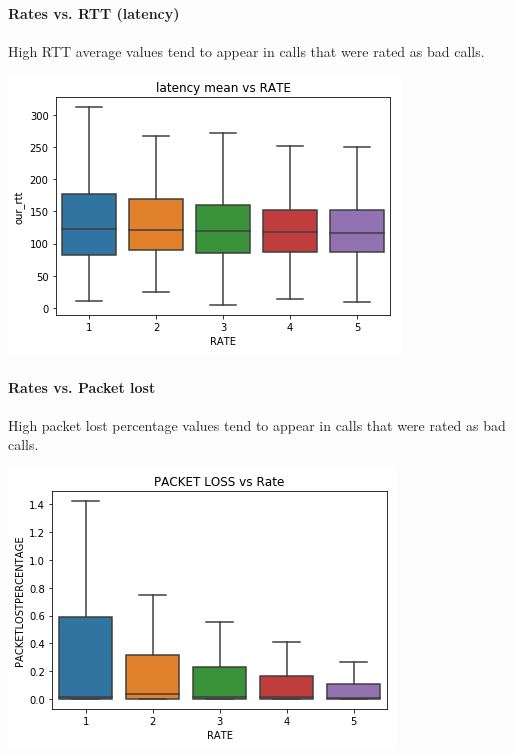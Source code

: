\paragraph{Rates vs. RTT (latency)}\label{rates-vs.-rtt-latency}

High RTT average values tend to appear in calls that were rated as bad
calls.

 


\begin{center}
\includegraphics{figures/output_27_0.png}
\end{center}

    
\paragraph{Rates vs. Packet lost}\label{rates-vs.-packet-lost}

High packet lost percentage values tend to appear in calls that were
rated as bad calls.




\begin{center}
\includegraphics{figures/output_29_0.png}
\end{center}
    
